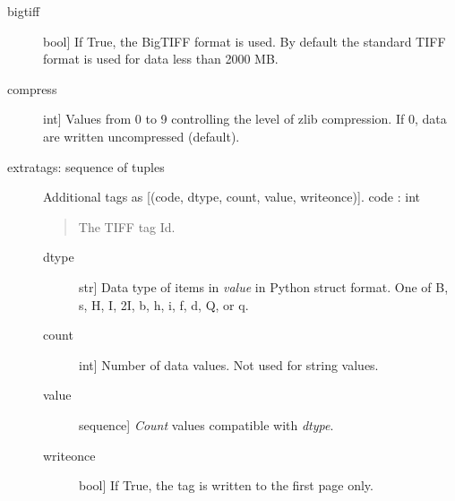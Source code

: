 \documentclass[letterpaper,10pt,english]{sphinxmanual}
\begin{document}
\begin{fulllineitems}
\begin{description}
\item[{bigtiff}] \leavevmode{[}bool{]}
If True, the BigTIFF format is used.
By default the standard TIFF format is used for data less than 2000 MB.

\item[{compress}] \leavevmode{[}int{]}
Values from 0 to 9 controlling the level of zlib compression.
If 0, data are written uncompressed (default).

\item[{extratags: sequence of tuples}] \leavevmode
Additional tags as {[}(code, dtype, count, value, writeonce){]}.
code : int
\begin{quote}

The TIFF tag Id.
\end{quote}
\begin{description}
\item[{dtype}] \leavevmode{[}str{]}
Data type of items in \emph{value} in Python struct format.
One of B, s, H, I, 2I, b, h, i, f, d, Q, or q.

\item[{count}] \leavevmode{[}int{]}
Number of data values. Not used for string values.

\item[{value}] \leavevmode{[}sequence{]}
\emph{Count} values compatible with \emph{dtype}.

\item[{writeonce}] \leavevmode{[}bool{]}
If True, the tag is written to the first page only.

\end{description}

\end{description}


\end{fulllineitems}
\end{document}
